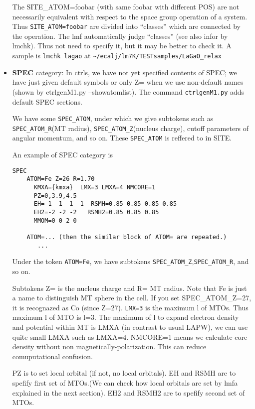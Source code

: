 \documentclass[a4paper,10pt,epsf,fleqn]{article}
\begin{document}
\begin{itemize}
The SITE\_ATOM=foobar (with same foobar with different POS) are not
necessarily equivalent with respect to the space group operation of a system.
Thus \verb+SITE_ATOM=foobar+ are divided into ``classes'' which are
connected by the operation. 
The lmf automatically judge ``classes'' (see also infor by lmchk). 
Thus not need to specify it, but it may be better to check it.
A sample is \verb+lmchk lagao+ at \verb+~/ecalj/lm7K/TESTsamples/LaGaO_relax+

\item
{\bf SPEC} category: 
In ctrls, we have not yet specified contents of SPEC; 
we have just given default symbols or only Z= when we use non-default
names (shown by ctrlgenM1.py --showatomlist).
The command \verb+ctrlgenM1.py+ adds default SPEC sections.

We have some \verb+SPEC_ATOM+, 
under which we give subtokens such as
\verb+SPEC_ATOM_R+(MT radius), \verb+SPEC_ATOM_Z+(nucleus charge), 
cutoff parameters of angular momentum, and so on. 
These \verb+SPEC_ATOM+ is reffered to in SITE.

An example of SPEC category is
\begin{verbatim}
SPEC                                                            
    ATOM=Fe Z=26 R=1.70 
      KMXA={kmxa}  LMX=3 LMXA=4 NMCORE=1                        
      PZ=0,3.9,4.5
      EH=-1 -1 -1 -1  RSMH=0.85 0.85 0.85 0.85          
      EH2=-2 -2 -2   RSMH2=0.85 0.85 0.85
      MMOM=0 0 2 0                                                    
  
    ATOM=... (then the similar block of ATOM= are repeated.)
       ...
\end{verbatim}
Under the token \verb+ATOM=Fe+, we have subtokens
\verb+SPEC_ATOM_Z+,\verb+SPEC_ATOM_R+, and so on.

Subtokens Z= is the nucleus charge and R= MT radius.
Note that Fe is just a name to distinguish MT sphere in the cell.
If you set SPEC\_ATOM\_Z=27, it is recognazed as Co (since Z=27). 
\verb+LMX=3+ is the maximum l of MTOs. Thus maximum l of MTO is l=3.
The maximum of l to expand electron density and potential within MT is
LMXA (in contrast to usual LAPW), we can use quite small LMXA such as
LMXA=4. NMCORE=1 means we calculate core density without non magnetically-polarization.
This can reduce comuputational confusion.

PZ is to set local orbital (if not, no local orbitals). EH and RSMH are
to spefify first set of MTOs.(We can check how local orbitals are 
set by lmfa explained in the next section).
EH2 and RSMH2 are to spefify second set of MTOs. 


\end{itemize}
\end{document}
